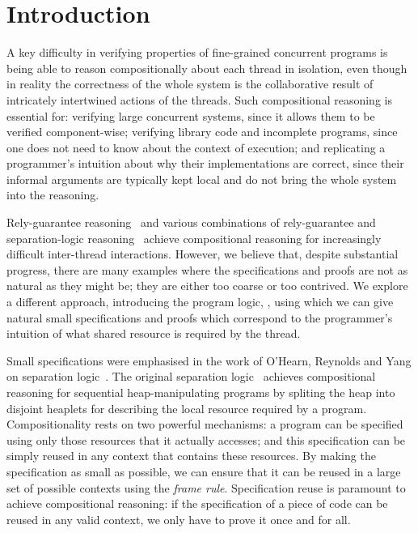 \section{Introduction}
\label{sec:introduction}




A key difficulty in verifying properties of fine-grained concurrent
programs is being able to reason compositionally about each thread in
isolation, even though in reality the correctness of the whole system
is the collaborative result of intricately intertwined actions of the
threads.  Such compositional reasoning is essential for: verifying
large concurrent systems, since it allows them to be verified
component-wise;  verifying library code and incomplete programs,
since one does not need to know about the context of execution; and 
replicating a programmer's intuition about why their implementations
are correct, since their informal arguments are typically  kept local and do
not bring the whole system into the reasoning.


Rely-guarantee reasoning~\cite{rg} and various combinations of
rely-guarantee and separation-logic
reasoning~\cite{viktor-marriage,dg,lrg,cap-ecoop10,icap,tada} achieve
compositional reasoning for increasingly difficult inter-thread
interactions. However, we believe that, despite substantial progress, there are many
examples where the specifications and proofs are not as natural as
they might be; they  are either too coarse or
too 
contrived. 
We explore a different approach, introducing the
program logic, \colosl, using which we can give natural small
specifications and proofs which correspond to the  programmer's intuition of what shared
resource
is required by the thread. 




Small specifications were emphasised  in the work of O'Hearn, Reynolds
and Yang on separation logic~\cite{paperincludesYang}. 
The original separation logic~\cite{rey02,seplog} achieves
compositional reasoning for sequential heap-manipulating programs by
spliting the heap into disjoint heaplets for describing the local
resource required by a program. Compositionality rests on two
powerful mechanisms: a program  can be specified using only those
resources that it actually accesses; and this specification can be
simply reused in any context that contains these resources.
By making the specification
as small  as possible, we can ensure that it
can be reused in a large set of possible contexts using  the {\em frame
rule}. 
 Specification reuse is paramount to achieve compositional
reasoning: if the specification of a piece of code can be reused in
any valid context, we only have  to prove it once and for all. 


